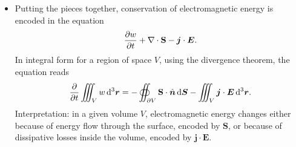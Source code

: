 \documentclass[11pt, a4paper]{article}
\newcommand{\diff}{\mathop{}\!\mathrm{d}} %
\newcommand{\dr}{\diff^{3} \r}  %
\renewcommand{\vec}[1]{\bm{#1}} %
\newcommand{\uvec}[1]{\hat{\vec{#1}}} %
\renewcommand{\r}{\vec{r}}
\newcommand{\E}{\vec{E}} %
\renewcommand{\S}{\mathbf{S}}  %
\renewcommand{\j}{\vec{j}}  %
\renewcommand{\div}{\nabla \cdot}
\begin{document}
\begin{itemize}
	\item Putting the pieces together, conservation of electromagnetic energy is encoded in the equation
	\begin{equation*}
		\pdv{w}{t} + \div \S - \j \cdot \E.
	\end{equation*}
    In integral form for a region of space $ V $, using the divergence theorem, the equation reads
	\begin{equation*}
		\pdv{t}\iiint_{V}w \dr = - \oiint_{\partial V} \S \cdot \uvec{n} \diff \vec{S} - \iiint_{V} \j \cdot \E \dr.
	\end{equation*}
	Interpretation: in a given volume $ V $, electromagnetic energy changes either because of energy flow through the surface, encoded by $ \S $, or because of dissipative losses inside the volume, encoded by $ \j \cdot \E $. 
\end{itemize}
\end{document}

